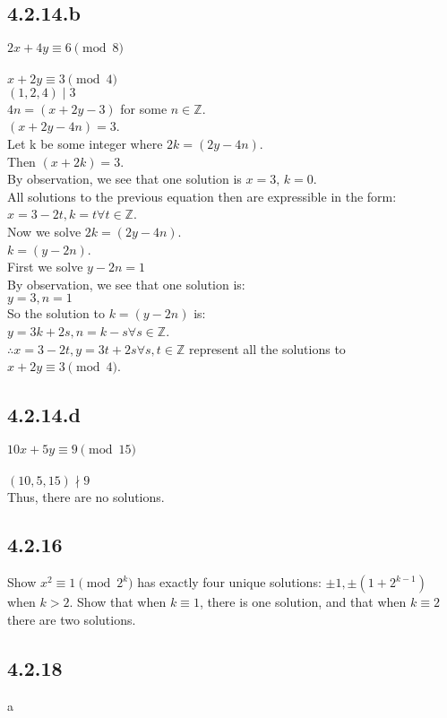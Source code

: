 \documentclass{article}
\begin{document}
\subsection{4.2.14.b}
$2x + 4y \equiv 6 \pmod{8}$
\\
\\$x + 2y \equiv 3 \pmod{4}$
\\$(1, 2, 4) \mid 3$
\\$4n = (x + 2y - 3)$ for some $n \in \mathbb{Z}$.
\\$(x + 2y - 4n) = 3$.
\\Let k be some integer where $2k = (2y - 4n)$.
\\Then $(x + 2k) = 3$.
\\By observation, we see that one solution is $x=3,\,k=0$.
\\All solutions to the previous equation then are expressible in the form:
\\$x=3-2t, k=t$\;\;$\forall t \in \mathbb{Z}$.
\\Now we solve $2k = (2y - 4n)$.
\\$k = (y - 2n)$.
\\First we solve $y-2n = 1$
\\By observation, we see that one solution is:
\\$y=3, n=1$
\\So the solution to $k = (y - 2n)$ is:
\\$y=3k+2s, n=k-s$\;\;$\forall s \in \mathbb{Z}$.
\\$\therefore x=3-2t, y=3t+2s$\;\;$\forall s,t \in \mathbb{Z}$ represent all the solutions to $x + 2y \equiv 3 \pmod{4}$.

\subsection{4.2.14.d}
$10x + 5y \equiv 9 \pmod{15}$
\\
\\$(10, 5, 15) \nmid 9$
\\Thus, there are no solutions.

\subsection{4.2.16}
Show $x^2 \equiv 1 \pmod{2^k}$ has exactly four unique solutions: $\pm1, \pm(1+2^{k-1})$ when $k>2$. Show that when $k \equiv 1$, there is one solution, and that when $k \equiv 2$ there are two solutions.
\\

\subsection{4.2.18}
a
\\
\end{document}
